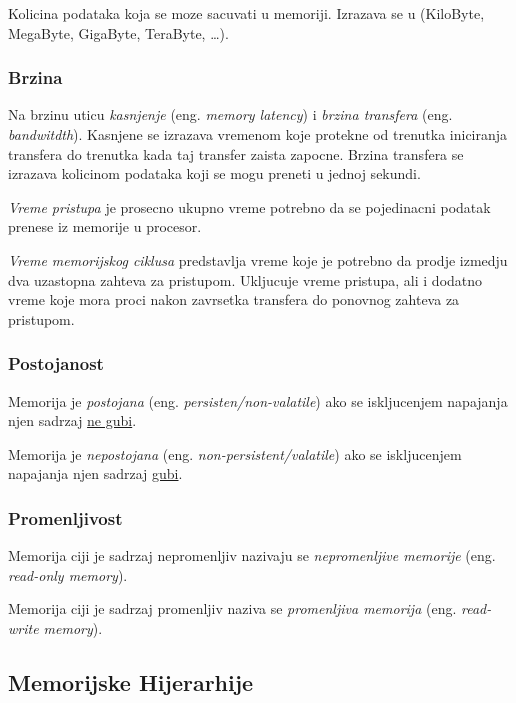 \documentclass[12p,a4paper]{article}
\begin{document}
\begin{multicols}{2}
    Kolicina podataka koja se moze sacuvati u memoriji. Izrazava se u
    (KiloByte, MegaByte, GigaByte, TeraByte, \ldots).

    \subsubsection{Brzina}
    
    Na brzinu uticu \emph{kasnjenje} (eng. \emph{memory latency}) i 
    \emph{brzina transfera} (eng. \emph{bandwitdth}). Kasnjene se 
    izrazava vremenom koje protekne od trenutka iniciranja transfera do
    trenutka kada taj transfer zaista zapocne. Brzina transfera se izrazava
    kolicinom podataka koji se mogu preneti u jednoj sekundi.

    \emph{Vreme pristupa} je prosecno ukupno vreme potrebno da se pojedinacni 
    podatak prenese iz memorije u procesor.

    \emph{Vreme memorijskog ciklusa} predstavlja vreme koje je potrebno da
    prodje izmedju dva uzastopna zahteva za pristupom. Ukljucuje vreme
    pristupa, ali i dodatno vreme koje mora proci nakon zavrsetka transfera
    do ponovnog zahteva za pristupom.
    
    \subsubsection{Postojanost}

    Memorija je \emph{postojana} (eng. \emph{persisten/non-valatile}) ako
    se iskljucenjem napajanja njen sadrzaj \underline{ne gubi}.

    Memorija je \emph{nepostojana} (eng. \emph{non-persistent/valatile}) ako
    se iskljucenjem napajanja njen sadrzaj \underline{gubi}.

    \subsubsection{Promenljivost}

    Memorija ciji je sadrzaj nepromenljiv nazivaju se \emph{nepromenljive 
    memorije} (eng. \emph{read-only memory}).

    Memorija ciji je sadrzaj promenljiv naziva se \emph{promenljiva memorija} 
    (eng. \emph{read-write memory}).

    \subsection{Memorijske Hijerarhije}


\end{multicols}
\end{document}
